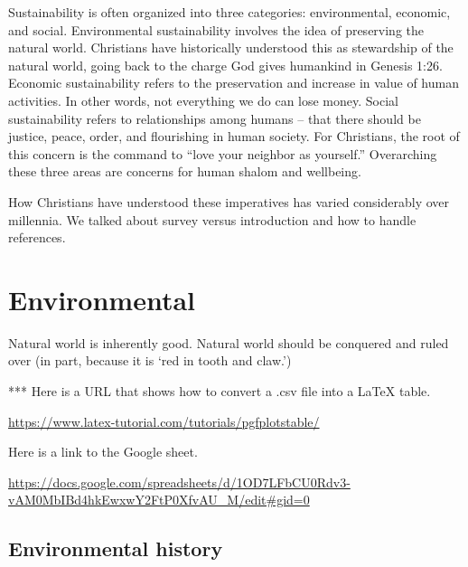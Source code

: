 \documentclass[12pt]{article}
\begin{document}
Sustainability is often organized into three categories: environmental, economic, and
social. Environmental sustainability involves the idea of preserving the natural world.
Christians have historically understood this as stewardship of the natural world, going
back to the charge God gives humankind in Genesis 1:26. Economic sustainability refers to
the preservation and increase in value of human activities. In other words, not everything
we do can lose money. Social sustainability refers to relationships among humans -- that
there should be justice, peace, order, and flourishing in human society. For Christians,
the root of this concern is the command to ``love your neighbor as yourself.'' Overarching
these three areas are concerns for human shalom and wellbeing.

How Christians have understood these imperatives has varied considerably over millennia. 
We talked about survey versus introduction and how to handle references.



\section{Environmental}
\label{sec:environmental}

Natural world is inherently good.
Natural world should be conquered and ruled over (in part, because it is `red in tooth and claw.')


*** Here is a URL that shows how to convert a .csv file into a LaTeX table.

\url{https://www.latex-tutorial.com/tutorials/pgfplotstable/}

Here is a link to the Google sheet.

{\tiny \url{https://docs.google.com/spreadsheets/d/1OD7LFbCU0Rdv3-vAM0MbIBd4hkEwxwY2FtP0XfvAU_M/edit#gid=0}}



\subsection{Environmental history}
\label{sec:environmental_history}
\end{document}
